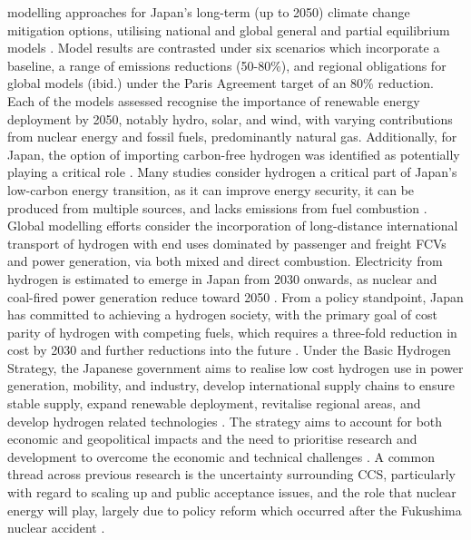 modelling approaches for Japan's long-term (up to 2050) climate change mitigation options, utilising national and global general and partial equilibrium models \cite{sugiyama_japans_2019}. Model results are contrasted under six scenarios which incorporate a baseline, a range of emissions reductions (50-80\%), and regional obligations for global models (ibid.) under the Paris Agreement target of an 80\% reduction. Each of the models assessed recognise the importance of renewable energy deployment by 2050, notably hydro, solar, and wind, with varying contributions from nuclear energy and fossil fuels, predominantly natural gas. Additionally, for Japan, the option of importing carbon-free hydrogen was identified as potentially playing a critical role \cite{akimoto_estimates_2010, matsuo_global_2013, oshiro_diffusion_2015, oshiro_diffusion_2015, sugiyama_japans_2019}. Many studies consider hydrogen a critical part of Japan's low-carbon energy transition, as it can improve energy security, it can be produced from multiple sources, and lacks emissions from fuel combustion \cite{iida_hydrogen_2019}. Global modelling efforts consider the incorporation of long-distance international transport of hydrogen with end uses dominated by passenger and freight \glspl{FCV} and power generation, via both mixed and direct combustion. Electricity from hydrogen is estimated to emerge in Japan from 2030 onwards, as nuclear and coal-fired power generation reduce toward 2050 \cite{ishimoto_significance_2017}. From a policy standpoint, Japan has committed to achieving a hydrogen society, with the primary goal of cost parity of hydrogen with competing fuels, which requires a three-fold reduction in cost by 2030 and further reductions into the future \cite{nagashima_japans_2018}. Under the Basic Hydrogen Strategy, the Japanese government aims to realise low cost hydrogen use in power generation, mobility, and industry, develop international supply chains to ensure stable supply, expand renewable deployment, revitalise regional areas, and develop hydrogen related technologies \cite{noauthor_basic_2017}. The strategy aims to account for both economic and geopolitical impacts and the need to prioritise research and development to overcome the economic and technical challenges \cite{nagashima_japans_2018}. A common thread across previous research is the uncertainty surrounding \gls{CCS}, particularly with regard to scaling up and public acceptance issues, and the role that nuclear energy will play, largely due to policy reform which occurred after the Fukushima nuclear accident \cite{oshiro_mid-century_2019}.

